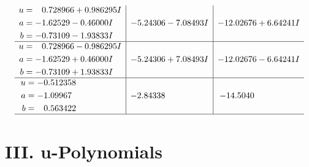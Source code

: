 \documentclass[1p]{elsarticle_modified}
\theoremstyle{definition}
\begin{document}
$$\begin{array}{c|c|c}
\begin{aligned}
u &= \phantom{-}0.728966 + 0.986295 I \\
a &= -1.62529 - 0.46000 I \\
b &= -0.73109 - 1.93833 I\end{aligned}
 & -5.24306 - 7.08493 I & -12.02676 + 6.64241 I \\ \hline\begin{aligned}
u &= \phantom{-}0.728966 - 0.986295 I \\
a &= -1.62529 + 0.46000 I \\
b &= -0.73109 + 1.93833 I\end{aligned}
 & -5.24306 + 7.08493 I & -12.02676 - 6.64241 I \\ \hline\begin{aligned}
u &= -0.512358\phantom{ +0.000000I} \\
a &= -1.09967\phantom{ +0.000000I} \\
b &= \phantom{-}0.563422\phantom{ +0.000000I}\end{aligned}
 & -2.84338\phantom{ +0.000000I} & -14.5040\phantom{ +0.000000I}\\
 \hline 
 \end{array}$$\newpage
\newpage\renewcommand{\arraystretch}{1}
\centering \section*{ III. u-Polynomials}
\end{document}
